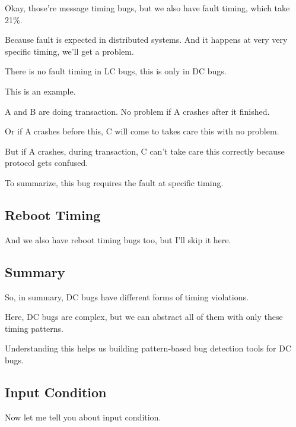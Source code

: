 Okay, those're message timing bugs, but we also have fault timing, which take
21\%.

Because fault is expected in distributed systems. And it happens at very very
specific timing, we'll get a problem.

There is no fault timing in LC bugs, this is only in DC bugs.

This is an example.

A and B are doing transaction. No problem if A crashes after it finished.

Or if A crashes before this, C will come to takes care this with no problem.

But if A crashes, during transaction, C can't take care this correctly because
protocol gets confused.

To summarize, this bug requires the fault at specific timing.

\subsection{Reboot Timing}

And we also have reboot timing bugs too, but I'll skip it here.





\subsection{Summary}

So, in summary, DC bugs have different forms of timing violations.

Here, DC bugs are complex, but we can abstract all of them with only these
timing patterns.

Understanding this helps us building pattern-based bug detection tools for DC
bugs.

\subsection{Input Condition}

Now let me tell you about input condition.


